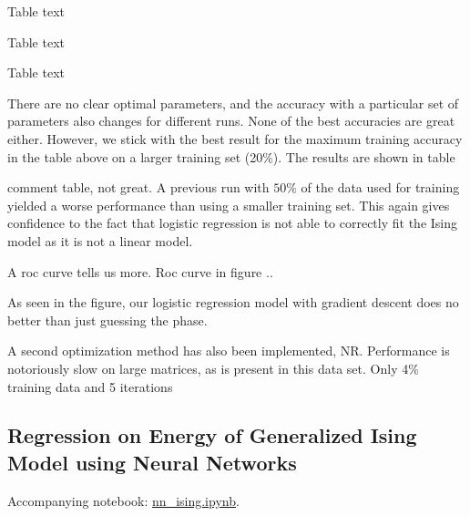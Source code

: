 \begin{table}[H]
\caption{Table text}
\centering
{}

\label{tab:opt params train}
\end{table}

\begin{table}[H]
\caption{Table text}
\centering
{}

\label{tab:opt params test}
\end{table}

\begin{table}[H]
\caption{Table text}
\centering
{}

\label{tab:opt params crit}
\end{table}

There are no clear optimal parameters, and the accuracy with a particular set of parameters also changes for different runs. None of the best accuracies are great either. However, we stick with the best result for the maximum training accuracy in the table above on a larger training set (20\%). The results are shown in table


comment table, not great. A previous run with $50\%$ of the data used for training yielded a worse performance than using a smaller training set. This again gives confidence to the fact that logistic regression is not able to correctly fit the Ising model as it is not a linear model. 

A roc curve tells us more. Roc curve in figure ..


As seen in the figure, our logistic regression model with gradient descent does no better than just guessing the phase.

A second optimization method has also been implemented, NR.
Performance is notoriously slow on large matrices, as is present in this data set. Only 4\% training data and 5 iterations 





\subsection{Regression on Energy of Generalized Ising Model using Neural Networks}\label{sec:results NN reg}
Accompanying notebook: \href{https://github.com/nicolossus/FYS-STK4155-Project2/blob/master/notebooks/nn_ising.ipynb}{nn\_ising.ipynb}.

